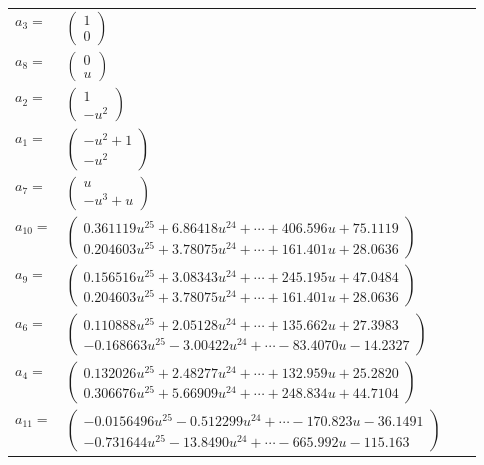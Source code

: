\documentclass[1p]{elsarticle_modified}
\theoremstyle{definition}
\begin{document}
\begin{tabular}{m{7pt} m{180pt} m{7pt} m{180pt} }
\flushright $a_{3}=$&$\begin{pmatrix}1\\0\end{pmatrix}$ \\
\flushright $a_{8}=$&$\begin{pmatrix}0\\u\end{pmatrix}$ \\
\flushright $a_{2}=$&$\begin{pmatrix}1\\- u^2\end{pmatrix}$ \\
\flushright $a_{1}=$&$\begin{pmatrix}- u^2+1\\- u^2\end{pmatrix}$ \\
\flushright $a_{7}=$&$\begin{pmatrix}u\\- u^3+u\end{pmatrix}$ \\
\flushright $a_{10}=$&$\begin{pmatrix}0.361119 u^{25}+6.86418 u^{24}+\cdots+406.596 u+75.1119\\0.204603 u^{25}+3.78075 u^{24}+\cdots+161.401 u+28.0636\end{pmatrix}$ \\
\flushright $a_{9}=$&$\begin{pmatrix}0.156516 u^{25}+3.08343 u^{24}+\cdots+245.195 u+47.0484\\0.204603 u^{25}+3.78075 u^{24}+\cdots+161.401 u+28.0636\end{pmatrix}$ \\
\flushright $a_{6}=$&$\begin{pmatrix}0.110888 u^{25}+2.05128 u^{24}+\cdots+135.662 u+27.3983\\-0.168663 u^{25}-3.00422 u^{24}+\cdots-83.4070 u-14.2327\end{pmatrix}$ \\
\flushright $a_{4}=$&$\begin{pmatrix}0.132026 u^{25}+2.48277 u^{24}+\cdots+132.959 u+25.2820\\0.306676 u^{25}+5.66909 u^{24}+\cdots+248.834 u+44.7104\end{pmatrix}$ \\
\flushright $a_{11}=$&$\begin{pmatrix}-0.0156496 u^{25}-0.512299 u^{24}+\cdots-170.823 u-36.1491\\-0.731644 u^{25}-13.8490 u^{24}+\cdots-665.992 u-115.163\end{pmatrix}$ \\

\end{tabular}
\end{document}
